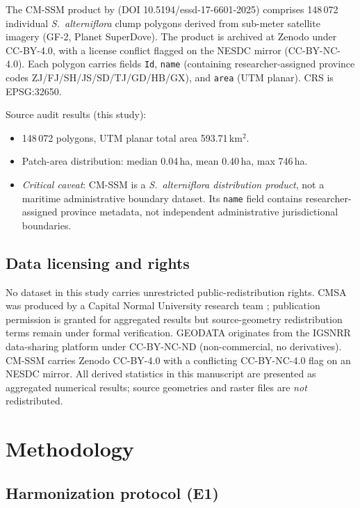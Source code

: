 \documentclass[11pt]{article}
\begin{document}
The CM-SSM product by \citet{zhou_2025_cmssm} (DOI 10.5194/essd-17-6601-2025)
comprises 148\,072 individual \textit{S.~alterniflora} clump polygons derived
from sub-meter satellite imagery (GF-2, Planet SuperDove). The product is
archived at Zenodo under CC-BY-4.0, with a license conflict flagged on the
NESDC mirror (CC-BY-NC-4.0). Each polygon carries fields \texttt{Id},
\texttt{name} (containing researcher-assigned province codes ZJ/FJ/SH/JS/SD/TJ/GD/HB/GX),
and \texttt{area} (UTM planar). CRS is EPSG:32650.

Source audit results (this study):
\begin{itemize}[nosep]
\item 148\,072 polygons, UTM planar total area 593.71\,km$^2$.
\item Patch-area distribution: median 0.04\,ha, mean 0.40\,ha, max 746\,ha.
\item \emph{Critical caveat}: CM-SSM is a \textit{S.~alterniflora distribution
  product}, not a maritime administrative boundary dataset. Its \texttt{name}
  field contains researcher-assigned province metadata, not independent
  administrative jurisdictional boundaries.
\end{itemize}

\subsection{Data licensing and rights}

No dataset in this study carries unrestricted public-redistribution rights.
CMSA was produced by a Capital Normal University research team
\citep{li_2024_cmsa}; publication permission is
granted for aggregated results but source-geometry redistribution terms remain
under formal verification. GEODATA originates from the IGSNRR data-sharing
platform under CC-BY-NC-ND (non-commercial, no derivatives). CM-SSM carries
Zenodo CC-BY-4.0 with a conflicting CC-BY-NC-4.0 flag on an NESDC mirror. All
derived statistics in this manuscript are presented as aggregated numerical
results; source geometries and raster files are \emph{not} redistributed.

\section{Methodology}
\label{sec:methods}

\subsection{Harmonization protocol (E1)}
\label{sec:methods-harm}
\end{document}
